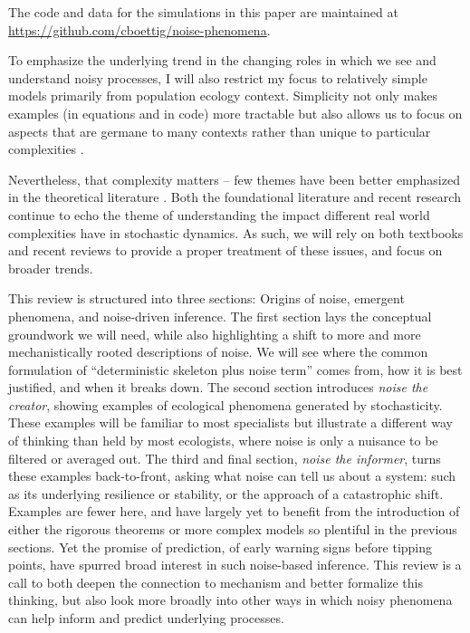 \documentclass[preprint, 3p,
authoryear]{elsarticle} %
\begin{document}
The code and data for the simulations in this paper are maintained at
\url{https://github.com/cboettig/noise-phenomena}.

To emphasize the underlying trend in the changing roles in which we see
and understand noisy processes, I will also restrict my focus to
relatively simple models primarily from population ecology context.
Simplicity not only makes examples (in equations and in code) more
tractable but also allows us to focus on aspects that are germane to
many contexts rather than unique to particular complexities
\citep{Levins1966, Bartlett1960}.

Nevertheless, that complexity matters -- few themes have been better
emphasized in the theoretical literature \citep{Bjornstad2001}. Both the
foundational literature and recent research continue to echo the theme
of understanding the impact different real world complexities have in
stochastic dynamics. As such, we will rely on both textbooks and recent
reviews to provide a proper treatment of these issues, and focus on
broader trends.

This review is structured into three sections: Origins of noise,
emergent phenomena, and noise-driven inference. The first section lays
the conceptual groundwork we will need, while also highlighting a shift
to more and more mechanistically rooted descriptions of noise. We will
see where the common formulation of ``deterministic skeleton plus noise
term'' comes from, how it is best justified, and when it breaks down.
The second section introduces \emph{noise the creator}, showing examples
of ecological phenomena generated by stochasticity. These examples will
be familiar to most specialists but illustrate a different way of
thinking than held by most ecologists, where noise is only a nuisance to
be filtered or averaged out. The third and final section, \emph{noise
the informer}, turns these examples back-to-front, asking what noise can
tell us about a system: such as its underlying resilience or stability,
or the approach of a catastrophic shift. Examples are fewer here, and
have largely yet to benefit from the introduction of either the rigorous
theorems or more complex models so plentiful in the previous sections.
Yet the promise of prediction, of early warning signs before tipping
points, have spurred broad interest in such noise-based inference. This
review is a call to both deepen the connection to mechanism and better
formalize this thinking, but also look more broadly into other ways in
which noisy phenomena can help inform and predict underlying processes.
\end{document}
